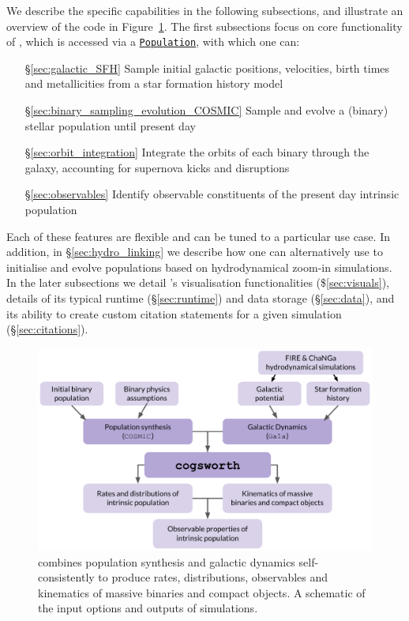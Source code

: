 \documentclass[twocolumn, twocolappendix, oneside, linenumbers]{aastex631}
\newcommand{\codeLink}[2]{{\href{https://cogsworth.readthedocs.io/en/latest/api/cogsworth.#2.#1.html}{\color{codecolour} \texttt{#1}}}}
\begin{document}
We describe the specific capabilities in the following subsections, and illustrate an overview of the code in Figure~\ref{fig:cogsworth_overview}. The first subsections focus on core functionality of \cogsworth, which is accessed via a \codeLink{Population}{pop}, with which one can:

\begin{itemize}
    \item [\S\ref{sec:galactic_SFH}] Sample initial galactic positions, velocities, birth times and metallicities from a star formation history model
    \item [\S\ref{sec:binary_sampling_evolution_COSMIC}] Sample and evolve a (binary) stellar population until present day
    \item [\S\ref{sec:orbit_integration}] Integrate the orbits of each binary through the galaxy, accounting for supernova kicks and disruptions
    \item [\S\ref{sec:observables}] Identify observable constituents of the present day intrinsic population
\end{itemize}
Each of these features are flexible and can be tuned to a particular use case. In addition, in \S\ref{sec:hydro_linking} we describe how one can alternatively use \cogsworth to initialise and evolve populations based on hydrodynamical zoom-in simulations. In the later subsections we detail \cogsworth's visualisation functionalities (\$\ref{sec:visuals}), details of its typical runtime (\S\ref{sec:runtime}) and data storage (\S\ref{sec:data}), and its ability to create custom citation statements for a given simulation (\S\ref{sec:citations}).

\begin{figure}
    \centering
    \includegraphics[width=\columnwidth]{figures/cogsworth_workflow_paper.pdf}
    \caption{\cogsworth combines population synthesis and galactic dynamics self-consistently to produce rates, distributions, observables and kinematics of massive binaries and compact objects. A schematic of the input options and outputs of \cogsworth simulations.}
    \label{fig:cogsworth_overview}
\end{figure}
\end{document}
